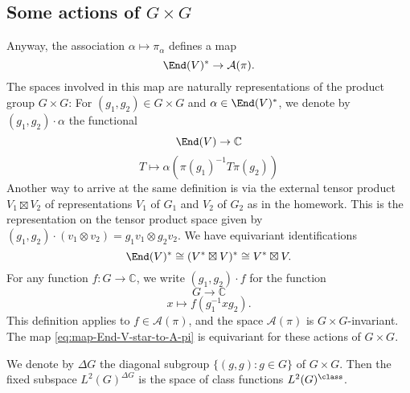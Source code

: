 \documentclass[reqno]{amsart} 
\begin{document}
\subsection{Some actions of \texorpdfstring{$G \times G$}{G x G}}
Anyway, the association $\alpha \mapsto \pi_\alpha$ defines a map
\begin{equation}\label{eq:map-End-V-star-to-A-pi}
  \End(V)^* \rightarrow \mathcal{A}(\pi).
\end{equation}
The spaces involved in this map are naturally representations of the product group $G \times G$: For $(g_1,g_2) \in G \times G$ and $\alpha \in \End(V)^*$, we denote by $(g_1,g_2) \cdot \alpha$ the functional
\begin{equation*}
  \End(V) \rightarrow \mathbb{C}
\end{equation*}
\begin{equation*}
  T \mapsto \alpha(\pi(g_1)^{-1} T \pi(g_2))
\end{equation*}
Another way to arrive at the same definition is via the external tensor product $V_1 \boxtimes V_2$ of representations $V_1$ of $G_1$ and $V_2$ of $G_2$ as in the homework.  This is the representation on the tensor product space given by $(g_1,g_2) \cdot (v_1 \otimes v_2) = g_1 v_1 \otimes g_2 v_2$.  We have equivariant identifications
\begin{equation}\label{eq:identify-End-V-star}
  \End(V)^*
  \cong
  (V^* \boxtimes V)^*
  \cong
  V^* \boxtimes V.
\end{equation}
For any function $f : G \rightarrow \mathbb{C}$, we write $(g_1,g_2) \cdot f$ for the function
\begin{equation*}
  G \rightarrow \mathbb{C}
\end{equation*}
\begin{equation*}
  x \mapsto f(g_1^{-1} x g_2).
\end{equation*}
This definition applies to $f \in \mathcal{A}(\pi)$, and the space $\mathcal{A}(\pi)$ is $G \times G$-invariant.  The map \eqref{eq:map-End-V-star-to-A-pi} is equivariant for these actions of $G \times G$.

We denote by $\Delta G$ the diagonal subgroup $\{(g,g) : g \in G\}$ of $G \times G$.  Then the fixed subspace $L^2(G)^{\Delta G}$ is the space of class functions $L^2(G)^{\class}$.
\end{document}

